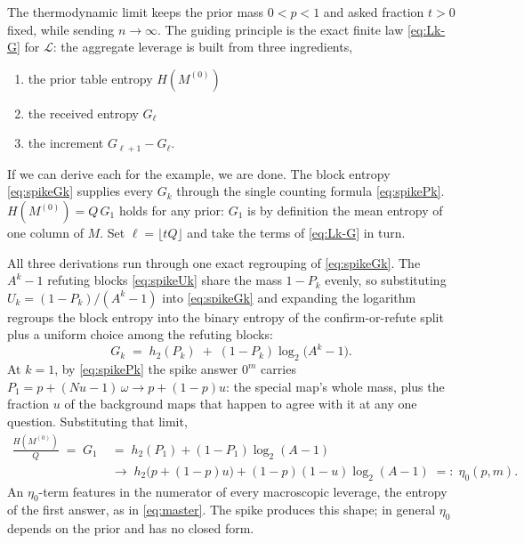 \documentclass[11pt]{article}
\begin{document}
The thermodynamic limit keeps the prior mass $0 < p < 1$ and asked fraction $t > 0$ fixed,
while sending $n \to \infty$. The guiding
principle is the exact finite law \eqref{eq:Lk-G} for $\mathcal L$: the aggregate
leverage is built from three ingredients, 

\begin{enumerate}
  \item the prior table entropy $H(M^{(0)})$
  \item the received entropy $G_\ell$
  \item the increment $G_{\ell+1} - G_\ell$.
\end{enumerate}

If we can derive each for the example, we are done. The block entropy \eqref{eq:spikeGk}
supplies every $G_k$ through the single counting formula
\eqref{eq:spikePk}. $H(M^{(0)}) = Q\,G_1$ holds for any prior:
$G_1$ is by definition the mean entropy of one column of $M$. Set
$\ell = \lfloor tQ\rfloor$ and take the terms of \eqref{eq:Lk-G} in
turn.

All three derivations run through one exact regrouping of
\eqref{eq:spikeGk}. The $A^k-1$ refuting blocks
\eqref{eq:spikeUk} share the mass $1-P_k$ evenly, so substituting
$U_k = (1-P_k)/(A^k-1)$ into \eqref{eq:spikeGk} and expanding the
logarithm regroups the block entropy into the binary entropy of the
confirm-or-refute split plus a uniform choice among the refuting
blocks:
%
\begin{equation}
  G_k \;=\; h_2(P_k) \;+\; (1-P_k)\log_2\!\big(A^k-1\big).
  \label{eq:spikeGsplit}
\end{equation}
%
At $k = 1$, by \eqref{eq:spikePk}
the spike answer $0^m$ carries
$P_1 = p + (Nu - 1)\,\omega \to p + (1-p)u$: the special map's whole
mass, plus the fraction $u$ of the background maps that happen to
agree with it at any one question. Substituting that limit,
%
\begin{equation}
\begin{aligned}
  \frac{H(M^{(0)})}{Q} \;=\; G_1
  \;&=\; h_2(P_1) + (1-P_1)\log_2(A-1) \\
  \;&\longrightarrow\;
  h_2\big(p + (1-p)u\big) + (1-p)(1-u)\log_2(A-1)
  \;=:\; \eta_0(p,m).
\end{aligned}
  \label{eq:hspike}
\end{equation}
%
An $\eta_0$-term features in the numerator of every macroscopic
leverage, the entropy of the first answer, as in \eqref{eq:master}. The spike produces this shape; 
in general $\eta_0$ depends on the prior and has no closed form.
\end{document}
